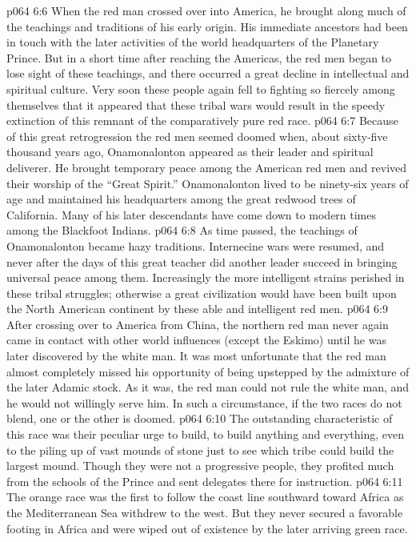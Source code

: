 \vs p064 6:6 When the red man crossed over into America, he brought along much of the teachings and traditions of his early origin. His immediate ancestors had been in touch with the later activities of the world headquarters of the Planetary Prince. But in a short time after reaching the Americas, the red men began to lose sight of these teachings, and there occurred a great decline in intellectual and spiritual culture. Very soon these people again fell to fighting so fiercely among themselves that it appeared that these tribal wars would result in the speedy extinction of this remnant of the comparatively pure red race.
\vs p064 6:7 Because of this great retrogression the red men seemed doomed when, about sixty\hyp{}five thousand years ago, Onamonalonton appeared as their leader and spiritual deliverer. He brought temporary peace among the American red men and revived their worship of the “Great Spirit.” Onamonalonton lived to be ninety\hyp{}six years of age and maintained his headquarters among the great redwood trees of California. Many of his later descendants have come down to modern times among the Blackfoot Indians.
\vs p064 6:8 As time passed, the teachings of Onamonalonton became hazy traditions. Internecine wars were resumed, and never after the days of this great teacher did another leader succeed in bringing universal peace among them. Increasingly the more intelligent strains perished in these tribal struggles; otherwise a great civilization would have been built upon the North American continent by these able and intelligent red men.
\vs p064 6:9 After crossing over to America from China, the northern red man never again came in contact with other world influences (except the Eskimo) until he was later discovered by the white man. It was most unfortunate that the red man almost completely missed his opportunity of being upstepped by the admixture of the later Adamic stock. As it was, the red man could not rule the white man, and he would not willingly serve him. In such a circumstance, if the two races do not blend, one or the other is doomed.
\pc \vs p064 6:10 \bibnobreakspace {} The outstanding characteristic of this race was their peculiar urge to build, to build anything and everything, even to the piling up of vast mounds of stone just to see which tribe could build the largest mound. Though they were not a progressive people, they profited much from the schools of the Prince and sent delegates there for instruction.
\vs p064 6:11 The orange race was the first to follow the coast line southward toward Africa as the Mediterranean Sea withdrew to the west. But they never secured a favorable footing in Africa and were wiped out of existence by the later arriving green race.

